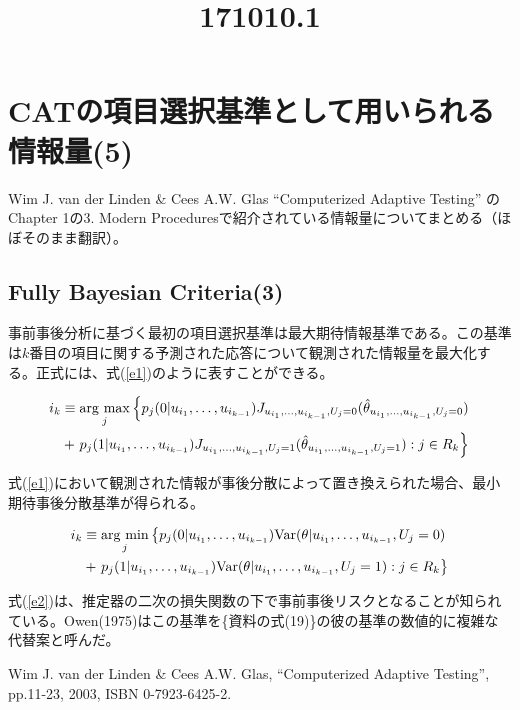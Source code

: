 \documentclass[a4j]{jarticle}
\date{}
\title{171010.1}
\begin{document}
\maketitle

\section{CATの項目選択基準として用いられる情報量(5)}
Wim J. van der Linden \& Cees A.W. Glas ``Computerized Adaptive Testing'' \cite{b1}のChapter 1の3. Modern Proceduresで紹介されている情報量についてまとめる（ほぼそのまま翻訳）。

\subsection{Fully Bayesian Criteria(3)}
事前事後分析に基づく最初の項目選択基準は最大期待情報基準である。この基準は$k$番目の項目に関する予測された応答について観測された情報量を最大化する。正式には、式(\ref{e1})のように表すことができる。

\newcommand{\argmax}{\mathop{\rm arg~max}\limits}
\begin{eqnarray}
\begin{split}
  \label{e1}
  i_{k} &\equiv \argmax_{j}\left\{p_{j}(0|u_{i_{1}},\ldots,u_{i_{k-1}})J_{u_{i_{1}},\ldots,u_{i_{k-1}},U_{j}=0}(\hat{\theta}_{u_{i_{1}},\ldots,u_{i_{k-1}},U_{j}=0})\right.\\
  &+\left.p_{j}(1|u_{i_{1}},\ldots,u_{i_{k-1}})J_{u_{i_{1}},\ldots,u_{i_{k-1}},U_{j}=1}(\hat{\theta}_{u_{i_{1}},\ldots,u_{i_{k-1}},U_{j}=1}):j\in R_{k}\right\}
\end{split}
\end{eqnarray}

式(\ref{e1})において観測された情報が事後分散によって置き換えられた場合、最小期待事後分散基準が得られる。

\newcommand{\argmin}{\mathop{\rm arg~min}\limits}
\begin{eqnarray}
\begin{split}
  \label{e2}
  i_{k} &\equiv \argmin_{j}\left\{p_{j}(0|u_{i_{1}},\ldots,u_{i_{k-1}}){\rm Var}(\theta|u_{i_{1}},\ldots,u_{i_{k-1}},U_{j}=0)\right.\\
  &+\left.p_{j}(1|u_{i_{1}},\ldots,u_{i_{k-1}}){\rm Var}(\theta|u_{i_{1}},\ldots,u_{i_{k-1}},U_{j}=1):j\in R_{k}\right\}
\end{split}
\end{eqnarray}

式(\ref{e2})は、推定器の二次の損失関数の下で事前事後リスクとなることが知られている。Owen(1975)はこの基準を\{資料の式(19)\}の彼の基準の数値的に複雑な代替案と呼んだ。

\begin{thebibliography}{9}
   Wim J. van der Linden \& Cees A.W. Glas, ``Computerized Adaptive Testing'', pp.11-23, 2003, ISBN 0-7923-6425-2.
\end{thebibliography}
\end{document}
